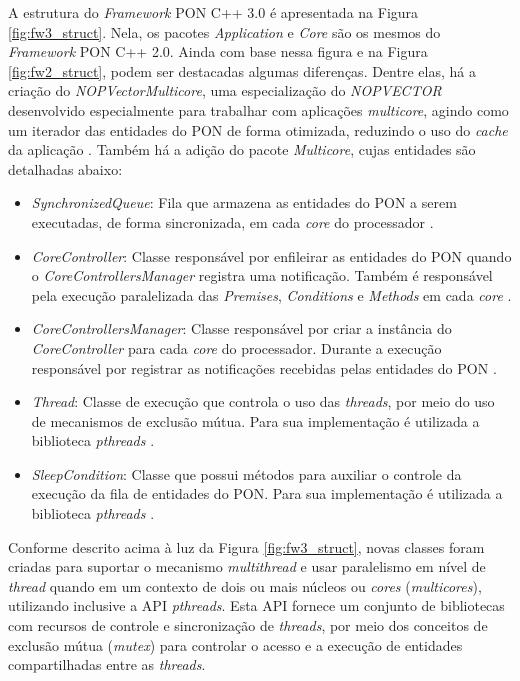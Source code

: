 A estrutura do \textit{Framework} PON C++ 3.0 é apresentada na Figura
\ref{fig:fw3_struct}. Nela, os pacotes \textit{Application} e \textit{Core} são
os mesmos do \textit{Framework} PON C++ 2.0. Ainda com base nessa figura e na
Figura \ref{fig:fw2_struct}, podem ser destacadas algumas diferenças. Dentre
elas, há a criação do \textit{NOPVectorMulticore}, uma especialização do
\textit{NOPVECTOR} desenvolvido especialmente para trabalhar com aplicações
\textit{multicore}, agindo como um iterador das entidades do PON de forma
otimizada, reduzindo o uso do \textit{cache} da aplicação
\cite{belmonte_2012,schutz_2018}. Também há a adição do pacote
\textit{Multicore}, cujas entidades são detalhadas abaixo:

\begin{itemize}
  \item \textit{SynchronizedQueue}: Fila que armazena as entidades do PON a
        serem executadas, de forma sincronizada, em cada \textit{core} do
        processador \cite{belmonte_2012,schutz_2018}.
  \item \textit{CoreController}: Classe responsável por enfileirar as entidades
        do PON quando o \textit{CoreControllersManager} registra uma
        notificação. Também é responsável pela execução paralelizada das
        \textit{Premises}, \textit{Conditions} e \textit{Methods} em cada
        \textit{core} \cite{belmonte_2012,schutz_2018}.
  \item \textit{CoreControllersManager}: Classe responsável por criar a
        instância do \textit{CoreController} para cada \textit{core} do
        processador. Durante a execução responsável por registrar as
        notificações recebidas pelas entidades do PON \cite{belmonte_2012,schutz_2018}.
  \item \textit{Thread}: Classe de execução que controla o uso das
        \textit{threads}, por meio do uso de mecanismos de exclusão mútua. Para
        sua implementação é utilizada a biblioteca \textit{pthreads}
        \cite{belmonte_2012,schutz_2018}.
  \item \textit{SleepCondition}: Classe que possui métodos para auxiliar o
        controle da execução da fila de entidades do PON. Para sua implementação
        é utilizada a biblioteca \textit{pthreads} \cite{belmonte_2012,schutz_2018}.
\end{itemize}

Conforme descrito acima à luz da Figura \ref{fig:fw3_struct}, novas classes
foram criadas para suportar o mecanismo \textit{multithread} e usar paralelismo
em nível de \textit{thread} quando em um contexto de dois ou mais núcleos ou
\textit{cores} (\textit{multicores}), utilizando inclusive a API \textit{pthreads}. Esta
API fornece um conjunto de bibliotecas com recursos de controle e sincronização
de \textit{threads}, por meio dos conceitos de exclusão mútua (\textit{mutex})
para controlar o acesso e a execução de entidades compartilhadas entre as
\textit{threads}.

